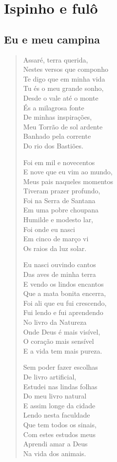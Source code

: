 \part{Ispinho e fulô}

\chapter{Eu e meu campina}

\begin{verse}
Assaré, terra querida,\\
Nestes versos que componho\\
Te digo que em minha vida\\
Tu és o meu grande sonho,\\
Desde o vale até o monte\\
És a milagrosa fonte\\
De minhas inspirações,\\
Meu Torrão de sol ardente\\
Banhado pela corrente\\
Do rio dos Bastiões.

Foi em mil e novecentos\\
E nove que eu vim ao mundo,\\
Meus pais naqueles momentos\\
Tiveram prazer profundo,\\
Foi na Serra de Santana\\
Em uma pobre choupana\\
Humilde e modesto lar,\\
Foi onde eu nasci\\
Em cinco de março vi\\
Os raios da luz solar.

Eu nasci ouvindo cantos\\
Das aves de minha terra\\
E vendo os lindos encantos\\
Que a mata bonita encerra,\\
Foi ali que eu fui crescendo,\\
Fui lendo e fui aprendendo\\
No livro da Natureza\\
Onde Deus é mais visível,\\
O coração mais sensível\\
E a vida tem mais pureza.

Sem poder fazer escolhas\\
De livro artificial,\\
Estudei nas lindas folhas\\
Do meu livro natural\\
E assim longe da cidade\\
Lendo nesta faculdade\\
Que tem todos os sinais,\\
Com estes estudos meus\\
Aprendi amar a Deus\\
Na vida dos animais.


\end{verse}
